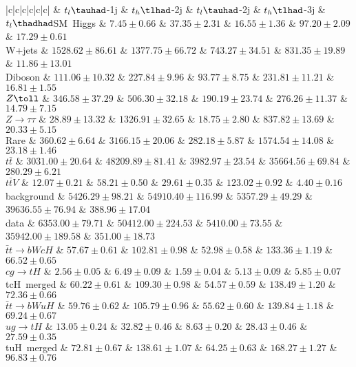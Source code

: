 \centering
\begin{tabular}{|c|c|c|c|c|c|} \toprule\toprule
 & $t_{l}\tauhad$-1j & $t_{h}\tlhad$-2j & $t_{l}\tauhad$-2j & $t_{h}\tlhad$-3j & $t_{l}\thadhad$SM~Higgs & $7.45\pm0.66$ & $37.35\pm2.31$ & $16.55\pm1.36$ & $97.20\pm2.09$ & $17.29\pm0.61$\\
W+jets & $1528.62\pm86.61$ & $1377.75\pm66.72$ & $743.27\pm34.51$ & $831.35\pm19.89$ & $11.86\pm13.01$\\
Diboson & $111.06\pm10.32$ & $227.84\pm9.96$ & $93.77\pm8.75$ & $231.81\pm11.21$ & $16.81\pm1.55$\\
$Z\toll$ & $346.58\pm37.29$ & $506.30\pm32.18$ & $190.19\pm23.74$ & $276.26\pm11.37$ & $14.79\pm7.15$\\
$Z\to\tau\tau$ & $28.89\pm13.32$ & $1326.91\pm32.65$ & $18.75\pm2.80$ & $837.82\pm13.69$ & $20.33\pm5.15$\\
Rare & $360.62\pm6.64$ & $3166.15\pm20.06$ & $282.18\pm5.87$ & $1574.54\pm14.08$ & $23.18\pm1.46$\\
$t\bar{t}$ & $3031.00\pm20.64$ & $48209.89\pm81.41$ & $3982.97\pm23.54$ & $35664.56\pm69.84$ & $280.29\pm6.21$\\
$t\bar{t}V$ & $12.07\pm0.21$ & $58.21\pm0.50$ & $29.61\pm0.35$ & $123.02\pm0.92$ & $4.40\pm0.16$\\
background & $5426.29\pm98.21$ & $54910.40\pm116.99$ & $5357.29\pm49.29$ & $39636.55\pm76.94$ & $388.96\pm17.04$\\
data & $6353.00\pm79.71$ & $50412.00\pm224.53$ & $5410.00\pm73.55$ & $35942.00\pm189.58$ & $351.00\pm18.73$\\
$\bar{t}t\to bWcH$ & $57.67\pm0.61$ & $102.81\pm0.98$ & $52.98\pm0.58$ & $133.36\pm1.19$ & $66.52\pm0.65$\\
$cg\to tH$ & $2.56\pm0.05$ & $6.49\pm0.09$ & $1.59\pm0.04$ & $5.13\pm0.09$ & $5.85\pm0.07$\\
tcH~merged & $60.22\pm0.61$ & $109.30\pm0.98$ & $54.57\pm0.59$ & $138.49\pm1.20$ & $72.36\pm0.66$\\
$\bar{t}t\to bWuH$ & $59.76\pm0.62$ & $105.79\pm0.96$ & $55.62\pm0.60$ & $139.84\pm1.18$ & $69.24\pm0.67$\\
$ug\to tH$ & $13.05\pm0.24$ & $32.82\pm0.46$ & $8.63\pm0.20$ & $28.43\pm0.46$ & $27.59\pm0.35$\\
tuH~merged & $72.81\pm0.67$ & $138.61\pm1.07$ & $64.25\pm0.63$ & $168.27\pm1.27$ & $96.83\pm0.76$\\
\bottomrule\bottomrule\\
\end{tabular}
